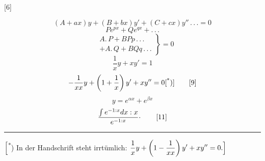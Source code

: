 \clearpage{}
\begin{center}[6]\end{center}
\begin{equation}
(A+ax)y+(B+bx)y'+(C+cx)y''\,{.}\,{.}\,{.}=0\tag*{[6]}
\end{equation}
\begin{equation}
Pe^{px}+Qe^{qx}+{.}\,{.}\,{.}\tag*{[7]}
\end{equation}
\[
\left.\begin{aligned}
&A{.}\,P+BPp\,{.}\,{.}\,{.}\\
&+A{.}\,Q+BQq\,{.}\,{.}\,{.}
\end{aligned}\right\}=0
\]
\begin{equation}
\frac1x y+xy'=1\tag*{[8]}
\end{equation}
\begin{equation}
-\frac1{xx}y+\left(1+\frac1x\right)y'+xy''=0\text{[\textsuperscript{*})]}\tag*{[9]}
\end{equation}
\begin{equation}
y=e^{\alpha x}+e^{\beta x}\tag*{[10]}
\end{equation}
\begin{equation}
\frac{\int e^{-1:x}dx:x}{e^{-1:x}}\mathpunct{\raisebox{.45ex}{.}}\tag*{[11]}
\end{equation}
\ClosingRule
\par\medskip\noindent\rule{.24\linewidth}{.4pt}\par\smallskip
{\small\noindent\hspace*{\parindent}\(\Bigl[\)\textsuperscript{*}) In der Handschrift steht irrtümlich: \(\displaystyle\frac1x y+\left(1-\frac1{xx}\right)y'+xy''=0.\Bigl]\)\par}
\par\endgroup{}
